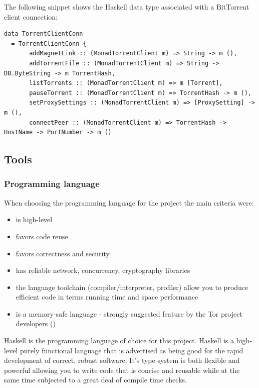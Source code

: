 \documentclass[11pt]{book} %
\begin{document}
The following snippet shows the Haskell  data type associated with a BitTorrent client connection: 

\begin{lstlisting}
data TorrentClientConn
  = TorrentClientConn {
       addMagnetLink :: (MonadTorrentClient m) => String -> m (),
       addTorrentFile :: (MonadTorrentClient m) => String -> DB.ByteString -> m TorrentHash,
       listTorrents :: (MonadTorrentClient m) => m [Torrent],
       pauseTorrent :: (MonadTorrentClient m) => TorrentHash -> m (),
       setProxySettings :: (MonadTorrentClient m) => [ProxySetting] -> m (),
       connectPeer :: (MonadTorrentClient m) => TorrentHash -> HostName -> PortNumber -> m ()
\end{lstlisting}

\subsection{Tools}


\subsubsection{Programming language}

When choosing the programming language for the project the main criteria were:

\begin{itemize}
\item is high-level
\item favors code reuse
\item favors correctness and security
\item has reliable network, concurrency, cryptography libraries
\item the language toolchain (compiler/interpreter, profiler) allow you to produce efficient code in terms running time and space performance
\item is a memory-safe language - strongly suggested feature by the Tor project developers (\citep*{web:torPluggableTransports})
\end{itemize}

Haskell is the programming language of choice for this project. Haskell is a high-level purely functional language that is advertised as being good for the rapid development of correct, robust software. It's type system is both flexible and powerful allowing you to write code that is concise and reusable while at the same time subjected to a great deal of compile time checks.
\end{document}

